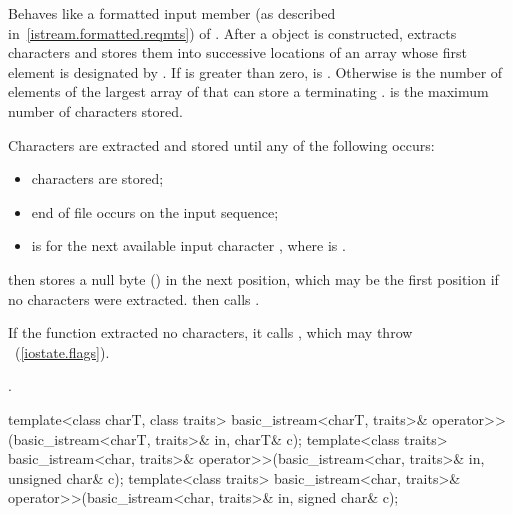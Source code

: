 \begin{itemdescr}
\pnum
\effects
Behaves like a formatted input member (as described in~\ref{istream.formatted.reqmts})
of .
After a
object is constructed,
extracts characters and stores them into
successive locations of an array whose first element is designated by
.
If
is greater than zero,  is
.
Otherwise  is the number of elements
of the largest array of
that can store a terminating
.
 is the maximum number of characters stored.

\pnum
Characters are extracted and stored until any of the following occurs:
\begin{itemize}
\item
{}
characters are stored;
\item
end of file occurs on the input sequence;
\item
{}
is
for the next available input character ,
where  is
.
\end{itemize}

\pnum
{}
then stores a null byte
()
in the next position, which may be the first position if no characters
were extracted.
then calls
.

\pnum
If the function extracted no characters, it calls
,
which may throw
~(\ref{iostate.flags}).

\pnum
\returns
{}.
\end{itemdescr}

%
%
\begin{itemdecl}
template<class charT, class traits>
  basic_istream<charT, traits>& operator>>(basic_istream<charT, traits>& in,
                                           charT& c);
template<class traits>
  basic_istream<char, traits>& operator>>(basic_istream<char, traits>& in,
                                          unsigned char& c);
template<class traits>
  basic_istream<char, traits>& operator>>(basic_istream<char, traits>& in,
                                          signed char& c);
\end{itemdecl}

